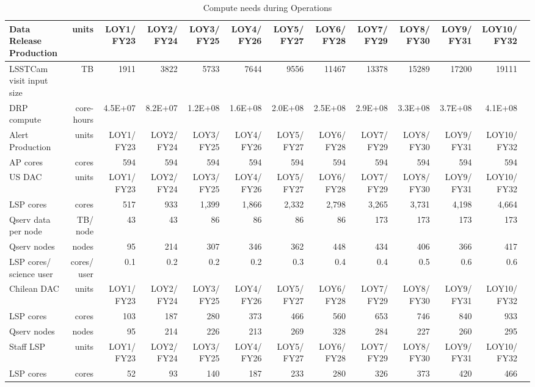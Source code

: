 \tiny \begin{longtable} { |p{}  |r  |r  |r  |r  |r  |r  |r  |r  |r  |r  |r  |r |} 
\caption{Compute needs during Operations \label{tab:computeSizingOps}}\\ 
\hline 
\textbf{Data Release Production}&\textbf{units}&\textbf{LOY1/ FY23}&\textbf{LOY2/ FY24}&\textbf{LOY3/ FY25}&\textbf{LOY4/ FY26}&\textbf{LOY5/ FY27}&\textbf{LOY6/ FY28}&\textbf{LOY7/ FY29}&\textbf{LOY8/ FY30}&\textbf{LOY9/ FY31}&\textbf{LOY10/ FY32} \\ \hline
{LSSTCam visit input size}&{TB}&{1911}&{3822}&{5733}&{7644}&{9556}&{11467}&{13378}&{15289}&{17200}&{19111} \\ \hline
{DRP compute}&{core-hours}&{4.5E+07}&{8.2E+07}&{1.2E+08}&{1.6E+08}&{2.0E+08}&{2.5E+08}&{2.9E+08}&{3.3E+08}&{3.7E+08}&{4.1E+08} \\ \hline
{Alert Production}&{units}&{LOY1/ FY23}&{LOY2/ FY24}&{LOY3/ FY25}&{LOY4/ FY26}&{LOY5/ FY27}&{LOY6/ FY28}&{LOY7/ FY29}&{LOY8/ FY30}&{LOY9/ FY31}&{LOY10/ FY32} \\ \hline
{AP cores}&{cores}&{594}&{594}&{594}&{594}&{594}&{594}&{594}&{594}&{594}&{594} \\ \hline
{US DAC}&{units}&{LOY1/ FY23}&{LOY2/ FY24}&{LOY3/ FY25}&{LOY4/ FY26}&{LOY5/ FY27}&{LOY6/ FY28}&{LOY7/ FY29}&{LOY8/ FY30}&{LOY9/ FY31}&{LOY10/ FY32} \\ \hline
{LSP cores}&{cores}&{517}&{933}&{1,399}&{1,866}&{2,332}&{2,798}&{3,265}&{3,731}&{4,198}&{4,664} \\ \hline
{Qserv data per node}&{TB/ node}&{43}&{43}&{86}&{86}&{86}&{86}&{173}&{173}&{173}&{173} \\ \hline
{Qserv nodes}&{nodes}&{95}&{214}&{307}&{346}&{362}&{448}&{434}&{406}&{366}&{417} \\ \hline
{LSP cores/ science user}&{cores/ user}&{0.1}&{0.2}&{0.2}&{0.2}&{0.3}&{0.4}&{0.4}&{0.5}&{0.6}&{0.6} \\ \hline
{Chilean DAC}&{units}&{LOY1/ FY23}&{LOY2/ FY24}&{LOY3/ FY25}&{LOY4/ FY26}&{LOY5/ FY27}&{LOY6/ FY28}&{LOY7/ FY29}&{LOY8/ FY30}&{LOY9/ FY31}&{LOY10/ FY32} \\ \hline
{LSP cores}&{cores}&{103}&{187}&{280}&{373}&{466}&{560}&{653}&{746}&{840}&{933} \\ \hline
{Qserv nodes}&{nodes}&{95}&{214}&{226}&{213}&{269}&{328}&{284}&{227}&{260}&{295} \\ \hline
{Staff LSP}&{units}&{LOY1/ FY23}&{LOY2/ FY24}&{LOY3/ FY25}&{LOY4/ FY26}&{LOY5/ FY27}&{LOY6/ FY28}&{LOY7/ FY29}&{LOY8/ FY30}&{LOY9/ FY31}&{LOY10/ FY32} \\ \hline
{LSP cores}&{cores}&{52}&{93}&{140}&{187}&{233}&{280}&{326}&{373}&{420}&{466} \\ \hline
\end{longtable} \normalsize

